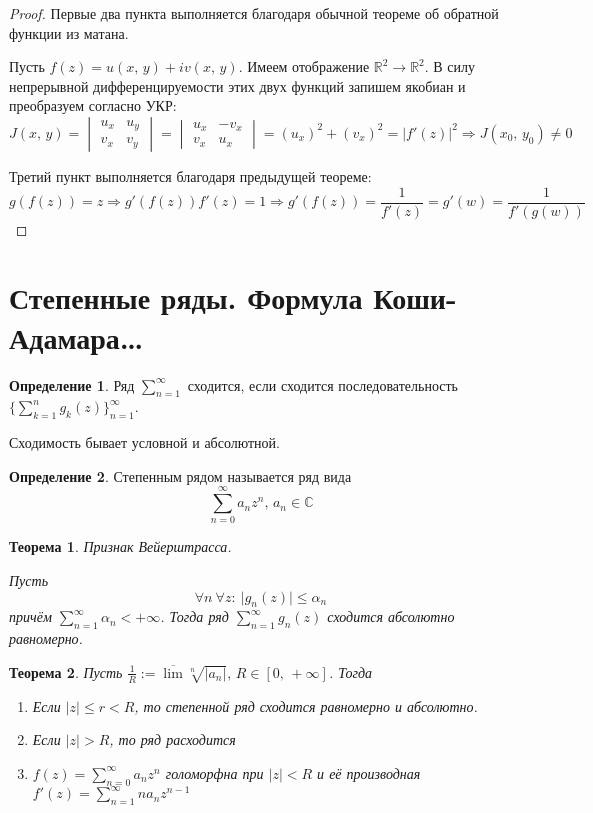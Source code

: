 \documentclass[a4paper,12pt]{article}
\renewcommand{\leq}{\ensuremath{\leqslant}}
\theoremstyle{plain}
\newtheorem{theorem}{Теорема}[section]
\theoremstyle{definition}
\newtheorem{definition}{Определение}[section]
\theoremstyle{remark}
\begin{document}
\begin{proof}
	Первые два пункта выполняется благодаря обычной теореме об обратной функции из матана.

	Пусть $f(z) = u(x,\,y) + iv(x,\,y)$. Имеем отображение $\mathbb{R}^2 \to \mathbb{R}^2$. В силу непрерывной дифференцируемости этих двух функций запишем якобиан и преобразуем согласно УКР:
	\[
		J(x,\,y) = \begin{vmatrix}
			u_x & u_y \\
			v_x & v_y
		\end{vmatrix} = \begin{vmatrix}
			u_x & -v_x \\
			v_x & u_x
		\end{vmatrix} = (u_x)^2 + (v_x)^2 = \vert f'(z)\vert^2 \Rightarrow J(x_0,\, y_0) \neq 0
	\]

	Третий пункт выполняется благодаря предыдущей теореме:
	\[
		g(f(z)) = z \Rightarrow g'(f(z))f'(z) = 1 \Rightarrow g'(f(z)) = \frac{1}{f'(z)} = g'(w) = \frac{1}{f'(g(w))}
	\]
\end{proof}

\section{Степенные ряды. Формула Коши-Адамара\dots}
\begin{definition}
	Ряд $\sum_{n = 1}^\infty$ сходится, если сходится последовательность $\{\sum_{k=1}^n g_k(z)\}_{n = 1}^\infty$.

	Сходимость бывает условной и абсолютной.
\end{definition}

\begin{definition}
	Степенным рядом называется ряд вида
	\[
		\sum_{n = 0}^\infty a_nz^n,\, a_n \in \mathbb{C}
	\]
\end{definition}

\begin{theorem}
	Признак Вейерштрасса.

	Пусть
	\[
		\forall n \: \forall z:\: \vert g_n(z)\vert \leq \alpha_n
	\]
	причём $\sum_{n = 1}^\infty \alpha_n < +\infty$. Тогда ряд $\sum_{n = 1}^\infty g_n(z)$ сходится абсолютно равномерно.
\end{theorem}

\begin{theorem}
	Пусть $\frac{1}{R} := \overline{\lim}\sqrt[n]{\vert a_n\vert},\, R \in [0,\, +\infty]$. Тогда
	\begin{enumerate}
		\item Если $\vert z\vert \leq r < R$, то степенной ряд сходится равномерно и абсолютно.
		\item Если $\vert z\vert > R$, то ряд расходится
		\item $f(z) = \sum_{n = 0}^\infty a_nz^n$ голоморфна при $\vert z\vert < R$ и её производная $f'(z) = \sum_{n = 1}^\infty na_nz^{n-1}$
	\end{enumerate}
\end{theorem}
\end{document}
